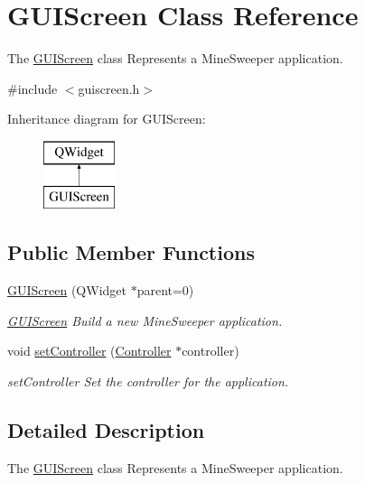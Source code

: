 \hypertarget{class_g_u_i_screen}{}\section{G\+U\+I\+Screen Class Reference}
\label{class_g_u_i_screen}


The \hyperlink{class_g_u_i_screen}{G\+U\+I\+Screen} class Represents a Mine\+Sweeper application.  




{\ttfamily \#include $<$guiscreen.\+h$>$}

Inheritance diagram for G\+U\+I\+Screen\+:\begin{figure}[H]
\begin{center}
\leavevmode
\includegraphics[height=2.000000cm]{class_g_u_i_screen}
\end{center}
\end{figure}
\subsection*{Public Member Functions}
\begin{DoxyCompactItemize}
\item 
\hyperlink{class_g_u_i_screen_aade2245bd739d9cd5cb667751c20dc05}{G\+U\+I\+Screen} (Q\+Widget $\ast$parent=0)
\begin{DoxyCompactList}\small\item\em \hyperlink{class_g_u_i_screen}{G\+U\+I\+Screen} Build a new Mine\+Sweeper application. \end{DoxyCompactList}\item 
void \hyperlink{class_g_u_i_screen_a02f2d6be64e2734c5a2cad7dc30689c1}{set\+Controller} (\hyperlink{class_controller}{Controller} $\ast$controller)
\begin{DoxyCompactList}\small\item\em set\+Controller Set the controller for the application. \end{DoxyCompactList}\end{DoxyCompactItemize}


\subsection{Detailed Description}
The \hyperlink{class_g_u_i_screen}{G\+U\+I\+Screen} class Represents a Mine\+Sweeper application. 

